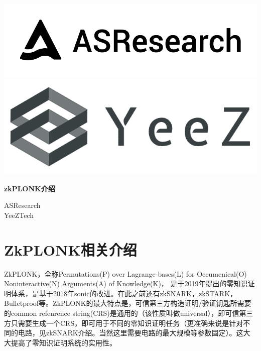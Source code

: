 \documentclass[12pt]{article}
\newcommand{\zk}{zkPLONK}
\begin{document}
\pagestyle{empty}
\renewcommand{\contentsname}{目录}
\renewcommand{\abstractname}{摘要}
\renewcommand{\refname}{参考文献}
\renewcommand{\figurename}{图}
\renewcommand{\tablename}{表}
\renewcommand{\baselinestretch}{1.5}
\renewcommand{\appendixname}{附录}
\renewcommand{\proofname}{证明}

\pagecolor{\pcolor}



\begin{titlepage}
  \begin{center}
    \vspace*{2.5cm}
    \includegraphics[scale=0.2]{../common/logo.png}\\
    \includegraphics[scale=0.2]{../common/yeez.png}

    \vspace{3.5cm}


   \textbf{\huge{\zk 介绍}}

    \vspace{2.5cm}
    ASResearch\\YeeZTech
  \end{center}

\end{titlepage}
\setcounter{page}{0}
\tableofcontents
\newpage
\setcounter{page}{1}
\pagestyle{fancy}
\vspace*{0.01cm}

\section{ZkPLONK相关介绍}
ZkPLONK，全称Permutations(P) over Lagrange-bases(L) for Oecumenical(O) Noninteractive(N) Arguments(A) of Knowledge(K)，
是于2019年提出的零知识证明体系，是基于2018年sonic的改进。在此之前还有zkSNARK，zkSTARK，Bulletproof等。ZkPLONK的最大特点是，可信第三方构造证明/验证钥匙所需要的common refenrence string(CRS)是通用的（该性质叫做universal），即可信第三方只需要生成一个CRS，即可用于不同的零知识证明任务（更准确来说是针对不同的电路，见zkSNARK介绍。当然这里需要电路的最大规模等参数固定）。这大大提高了零知识证明系统的实用性。
\end{document}
